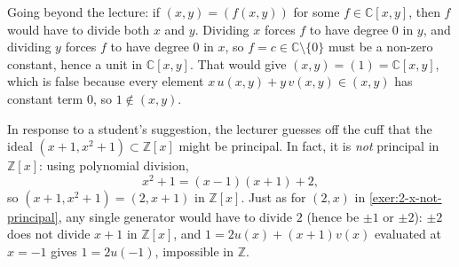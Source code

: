 \begin{content}
\begin{steps}
Going beyond the lecture: if $(x, y) = (f(x, y))$ for some $f \in \mathbb{C}[x, y]$, then $f$ would have to divide both $x$ and $y$. Dividing $x$ forces $f$ to have degree $0$ in $y$, and dividing $y$ forces $f$ to have degree $0$ in $x$, so $f = c \in \mathbb{C} \setminus \{0\}$ must be a non-zero constant, hence a unit in $\mathbb{C}[x, y]$. That would give $(x, y) = (1) = \mathbb{C}[x, y]$, which is false because every element $x \, u(x, y) + y \, v(x, y) \in (x, y)$ has constant term $0$, so $1 \notin (x, y)$.
\end{steps}
\end{content}

\begin{aiNote}
In response to a student's suggestion, the lecturer guesses off the cuff that the ideal $(x + 1, x^2 + 1) \subset \mathbb{Z}[x]$ might be principal. In fact, it is \emph{not} principal in $\mathbb{Z}[x]$: using polynomial division,
\[
x^2 + 1 = (x - 1)(x + 1) + 2,
\]
so $(x + 1, x^2 + 1) = (2, x + 1)$ in $\mathbb{Z}[x]$. Just as for $(2, x)$ in \cref{exer:2-x-not-principal}, any single generator would have to divide $2$ (hence be $\pm 1$ or $\pm 2$): $\pm 2$ does not divide $x + 1$ in $\mathbb{Z}[x]$, and $1 = 2 u(x) + (x + 1) v(x)$ evaluated at $x = -1$ gives $1 = 2 u(-1)$, impossible in $\mathbb{Z}$.
\end{aiNote}

